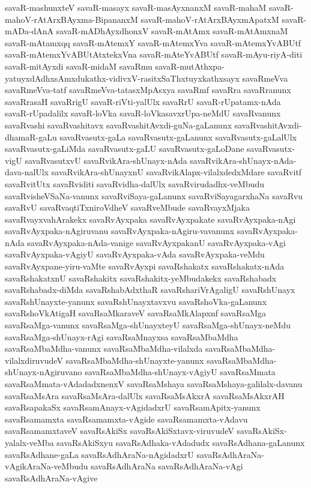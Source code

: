 {savaR-mashunxteV
savaR-masayx
savaR-masAyxnanxM
savaR-mahaM
savaR-mahoV-rAtArxBAyxma-BipananxM
savaR-mahoV-rAtArxBAyxmApatxM
savaR-mADa-dAnA
savaR-mADhAyxdhonxV
savaR-mAtAmx
savaR-mAtAmxnaM
savaR-mAtamxqq
savaR-mAtemxY
savaR-mAtemxYva
savaR-mAtemxYvABUtf
savaR-mAtemxYvABUtAtxtekxVna
savaR-mAteYvABUtf
savaR-mAyu-riyA-diti
savaR-mitAyxdi
savaR-midaM
savaRmu
savaR-mutAthxpa-yatuyxdAdhxsAmxdukathx-vidivxV-rasitxSaThxtuyxkathxsayx
savaRmeVva
savaRmeVva-tatf
savaRmeVva-tatasxMpAsxya
savaRmf
savaRra
savaRranunx
savaRrasaH
savaRrigU
savaR-riVti-yalUlx
savaRrU
savaR-rUpatamx-nAda
savaR-rUpadalilx
savaR-loVka
savaR-loVkasavxrUpa-neMdU
savaRvanunx
savaRvashi
savaRvashitavx
savaRvashitAvxdi-guNa-gaLanunx
savaRvashitAvxdi-dhamaR-gaLu
savaRvasutx-gaLa
savaRvasutx-gaLanunx
savaRvasutx-gaLalUlx
savaRvasutx-gaLiMda
savaRvasutx-gaLU
savaRvasutx-gaLoDane
savaRvasutx-vigU
savaRvasutxvU
savaRvikAra-shUnayx-nAda
savaRvikAra-shUnayx-nAda-dava-nalUlx
savaRvikAra-shUnayxnU
savaRvikAlapx-vilalxdedxMdare
savaRvitf
savaRvitUtx
savaRviditi
savaRvidha-dalUlx
savaRvirudadhx-veMbudu
savaRvisheVSaNa-vanunx
savaRviSaya-gaLanunx
savaRviSayagarxhaNa
savaRvu
savaRvU
savaRvaqtiTxniroVdheV
savaRveMbude
savaRvayxMjaka
savaRvayxvahArakekx
savaRvAyxpaka
savaRvAyxpakate
savaRvAyxpaka-nAgi
savaRvAyxpaka-nAgiruvanu
savaRvAyxpaka-nAgiru-vavanunx
savaRvAyxpaka-nAda
savaRvAyxpaka-nAda-vanige
savaRvAyxpakanU
savaRvAyxpaka-vAgi
savaRvAyxpaka-vAgiyU
savaRvAyxpaka-vAda
savaRvAyxpaka-veMdu
savaRvAyxpane-yiru-vaMte
savaRvAyxpi
savaRshakatx
savaRshakatx-nAda
savaRshakatxnU
savaRshakitx
savaRshakitx-yeMbudakekx
savaRshabadx
savaRshabadx-diMda
savaRshabAdxthaR
savaRshariVrAgaligU
savaRshUnayx
savaRshUnayxte-yanunx
savaRshUnayxtavxvu
savaRshoVka-gaLanunx
savaRshoVkAtigaH
savaRsaMkaraveV
savaRsaMkAlapxnf
savaRsaMga
savaRsaMga-vanunx
savaRsaMga-shUnayxteyU
savaRsaMga-shUnayx-neMdu
savaRsaMga-shUnayx-rAgi
savaRsaMnayxsa
savaRsaMbaMdha
savaRsaMbaMdha-vanunx
savaRsaMbaMdha-vilalxda
savaRsaMbaMdha-vilalxdiruvudeV
savaRsaMbaMdha-shUnayxte-yanunx
savaRsaMbaMdha-shUnayx-nAgiruvano
savaRsaMbaMdha-shUnayx-vAgiyU
savaRsaMmata
savaRsaMmata-vAdadadxnenxV
savaRsaMshaya
savaRsaMshaya-galilalx-davanu
savaRsaMsAra
savaRsaMsAra-dalUlx
savaRsaMsAkxrA
savaRsaMsAkxrAH
savaRsapakaSx
savaRsamAnayx-vAgidadxrU
savaRsamApitx-yanunx
savaRsamamxta
savaRsamamxta-vAgide
savaRsamamxta-vAdavu
savaRsamamxtaveV
savaRsAkiSx
savaRsAkiSxtavx-viruvudeV
savaRsAkiSx-yalalx-veMba
savaRsAkiSxyu
savaRsAdhaka-vAdadudx
savaRsAdhana-gaLanunx
savaRsAdhane-gaLa
savaRsAdhAraNa-nAgidadxrU
savaRsAdhAraNa-vAgikAraNa-veMbudu
savaRsAdhAraNa
savaRsAdhAraNa-vAgi
savaRsAdhAraNa-vAgive
}
